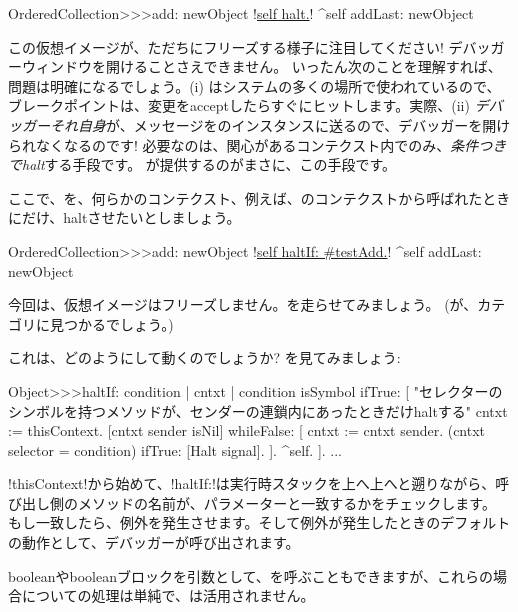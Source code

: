 \documentclass[a4paper,10pt,twoside]{book}
\begin{document}
\begin{code}{}
OrderedCollection>>>add: newObject
	!\underline{self halt.}!
	^self addLast: newObject
\end{code}

この仮想イメージが、ただちにフリーズする様子に注目してください! デバッガーウィンドウを開けることさえできません。
いったん次のことを理解すれば、問題は明確になるでしょう。(i) はシステムの多くの場所で使われているので、ブレークポイントは、変更をacceptしたらすぐにヒットします。実際、(ii) \emph{デバッガーそれ自身}が、メッセージをのインスタンスに送るので、デバッガーを開けられなくなるのです!
必要なのは、関心があるコンテクスト内でのみ、\emph{条件つきでhalt}する手段です。
が提供するのがまさに、この手段です。

ここで、を、何らかのコンテクスト、例えば、のコンテクストから呼ばれたときにだけ、haltさせたいとしましょう。

\begin{code}{}
OrderedCollection>>>add: newObject
	!\underline{self haltIf: \#testAdd.}!
	^self addLast: newObject
\end{code}

今回は、仮想イメージはフリーズしません。を走らせてみましょう。
(が、カテゴリに見つかるでしょう。)

これは、どのようにして動くのでしょうか? を見てみましょう:
\begin{code}{}
Object>>>haltIf: condition
	| cntxt |
	condition isSymbol ifTrue: [
		"セレクターのシンボルを持つメソッドが、センダーの連鎖内にあったときだけhaltする"
		cntxt := thisContext.
		[cntxt sender isNil] whileFalse: [
			cntxt := cntxt sender. 
			(cntxt selector = condition) ifTrue: [Halt signal]. ].
		^self.
	].
	...
\end{code}

\ct!thisContext!から始めて、\ct!haltIf:!は実行時スタックを上へ上へと遡りながら、呼び出し側のメソッドの名前が、パラメーターと一致するかをチェックします。
もし一致したら、例外を発生させます。そして例外が発生したときのデフォルトの動作として、デバッガーが呼び出されます。

booleanやbooleanブロックを引数として、を呼ぶこともできますが、これらの場合についての処理は単純で、は活用されません。
\end{document}
